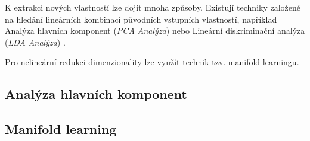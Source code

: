K extrakci nových vlastností lze dojít mnoha způsoby.
Existují techniky založené na hledání lineárních kombinací původních vstupních vlastností, například Analýza hlavních komponent (\emph{PCA Analýza}) nebo Lineární diskriminační analýza (\emph{LDA Analýza}) .

Pro nelineární redukci dimenzionality lze využít technik tzv. manifold learningu.


\subsection{Analýza hlavních komponent}
\label{sec:pca}

\subsection{Manifold learning}